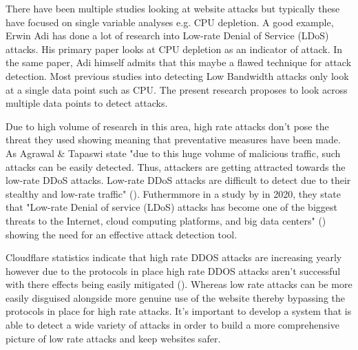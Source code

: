 
There have been multiple studies looking at website attacks but typically these have focused on single variable analyses e.g. CPU depletion. A good example, Erwin Adi has done a lot of research into Low-rate Denial of Service (LDoS) attacks. His primary paper looks at CPU depletion as an indicator of attack. In the same paper, Adi himself admits that this maybe a flawed technique for attack detection. \cite{Adi2016} Most previous studies into detecting Low Bandwidth attacks only look at a single data point such as CPU. The present research proposes to look across multiple data points to detect attacks. 

Due to high volume of research in this area, high rate attacks don't pose the threat they used showing meaning that preventative measures have been made. As Agrawal \& Tapaswi state "due to this huge volume of malicious traffic, such attacks can be easily detected. Thus, attackers are getting attracted towards the low-rate DDoS attacks. Low-rate DDoS attacks are difficult to detect due to their stealthy and low-rate traffic" (\cite{8794618}). Futhermmore in a study by \citeauthor{9016229} in 2020, they state that "Low-rate Denial of service (LDoS) attacks has become one of the biggest threats to the Internet, cloud computing platforms, and big data centers" (\cite{9016229}) showing the need for an effective attack detection tool.

Cloudflare statistics indicate that high rate DDOS attacks are increasing yearly however due to the protocols in place high rate DDOS attacks aren't successful with there effects being easily mitigated (\cite{Q3attacks}). Whereas low rate attacks can be more easily disguised alongside more genuine use of the website thereby bypassing the protocols in place for high rate attacks. It's important to develop a system that is able to detect a wide variety of attacks in order to build a more comprehensive picture of low rate attacks and keep websites safer.

